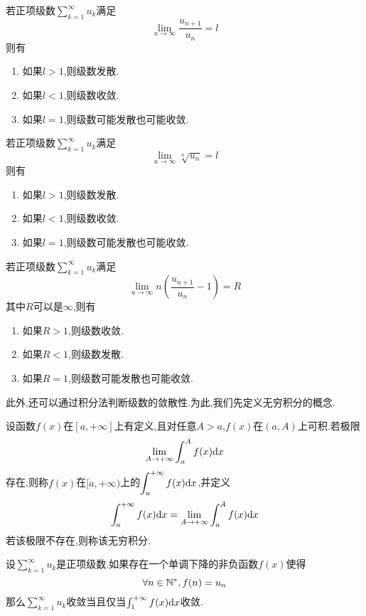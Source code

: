 \documentclass{ctexart}
\begin{document}
\begin{formal}[2.4 达朗贝尔判别法]
    若正项级数$\displaystyle\sum_{k=1}^\infty u_k$满足
    \[\lim_{u\to\infty}\dfrac{u_{n+1}}{u_n}=l\]
    则有
    \begin{enumerate}[label=\tbf{\arabic*.}]
        \item 如果$l>1$,则级数发散.
        \item 如果$l<1$,则级数收敛.
        \item 如果$l=1$,则级数可能发散也可能收敛.
    \end{enumerate}
\end{formal}
\begin{formal}[2.5 柯西判别法]
    若正项级数$\displaystyle\sum_{k=1}^\infty u_k$满足
    \[\lim_{u\to\infty}\sqrt[n]{u_n}=l\]
    则有
    \begin{enumerate}[label=\tbf{\arabic*.}]
        \item 如果$l>1$,则级数发散.
        \item 如果$l<1$,则级数收敛.
        \item 如果$l=1$,则级数可能发散也可能收敛.
    \end{enumerate}
\end{formal}
\begin{formal}[2.6 拉比判别法]
    若正项级数$\displaystyle\sum_{k=1}^\infty u_k$满足
    \[\lim_{u\to\infty}n\left(\dfrac{u_{n+1}}{u_n}-1\right)=R\]
    其中$R$可以是$\infty$,则有
    \begin{enumerate}[label=\tbf{\arabic*.}]
        \item 如果$R>1$,则级数收敛.
        \item 如果$R<1$,则级数发散.
        \item 如果$R=1$,则级数可能发散也可能收敛.
    \end{enumerate}
\end{formal}\noindent
此外,还可以通过积分法判断级数的敛散性.为此,我们先定义无穷积分的概念.
\begin{definition}[2.7 定义:无穷积分及其敛散性]
    设函数$f(x)$在$[a,+\infty]$上有定义,且对任意$A>a$,$f(x)$在$(a,A)$上可积.若极限
    \[\lim_{A\to+\infty}\int_a^Af(x)\mathrm{d} x\]
    存在,则称$f(x)$在$[a,+\infty)$上的$\displaystyle\int_a^{+\infty}f(x)\mathrm{d} x$,并定义
    \[\int_a^{+\infty}f(x)\mathrm{d} x=\lim_{A\to+\infty}\int_a^Af(x)\mathrm{d} x\]
    若该极限不存在,则称该无穷积分.
\end{definition}
\begin{formal}[2.8 积分判别法]
    设$\displaystyle\sum_{k=1}^\infty u_k$是正项级数.如果存在一个单调下降的非负函数$f(x)$使得
    \[\forall n\in\mathbb{N}^*,f(n)=u_n\]
    那么$\displaystyle\sum_{k=1}^\infty u_k$收敛当且仅当$\int_1^{+\infty}f(x)\mathrm{d} x$收敛.
\end{formal}
\end{document}

